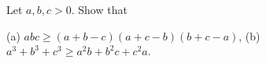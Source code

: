Let $a, b, c > 0$. Show that

(a) $abc \geq (a + b - c)(a + c - b)(b + c - a)$, (b) $a^3 + b^3 + c^3 \geq a^2b + b^2c + c^2a$.

